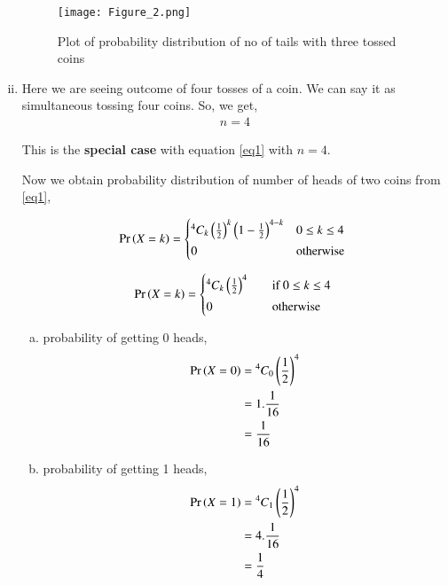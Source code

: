 \documentclass[journal,12pt,twocolumn]{IEEEtran}
\begin{document}
\begin{enumerate}[(i)]
\begin{figure}[h!]
    \centering
    \texttt{[image: Figure\_2.png]}
    \caption{Plot of probability distribution of no of tails with three tossed coins}
    \label{fig:Three coins}
\end{figure}



\item

Here we are seeing outcome of four tosses of a coin. We can say it as simultaneous tossing four coins. So, we get,
\begin{align}
    n=4
\end{align}

This is the \textbf{special case} with equation \eqref{eq1} with $n=4$.

Now we obtain probability distribution of number of heads of two coins from \eqref{eq1},

\begin{align*}
   \pr{X=k} =
  \begin{cases*}
    {^4 C_k}\brak{\frac{1}{2}}^{k}\brak{1-\frac{1}{2}}^{4-k} & $0 \leq k \leq 4$\\
    0 & otherwise
  \end{cases*}
\end{align*}

\begin{align}
   \pr{X=k} =
  \begin{cases*}
    {^4 C_k}\brak{\frac{1}{2}}^{4} \quad& if $0 \leq k \leq 4$ \\
    0 \quad& otherwise
  \end{cases*}
\end{align}

\begin{enumerate}[(a)]
    \item probability of getting 0 heads,
        \begin{align}
            \begin{split}
                \Pr\left(X=0\right) &= {^4C_0}\left(\frac{1}{2}\right)^4\\
                &=1.\frac{1}{16}\\
                &=\frac{1}{16}
            \end{split}
        \end{align}

    \item probability of getting 1 heads,
        \begin{align}
            \begin{split}
                \Pr\left(X=1\right) &= {^4C_1}\left(\frac{1}{2}\right)^4\\
                &=4.\frac{1}{16}\\
                &=\frac{1}{4}
            \end{split}
        \end{align}


\end{enumerate}
\end{enumerate}
\end{document}
